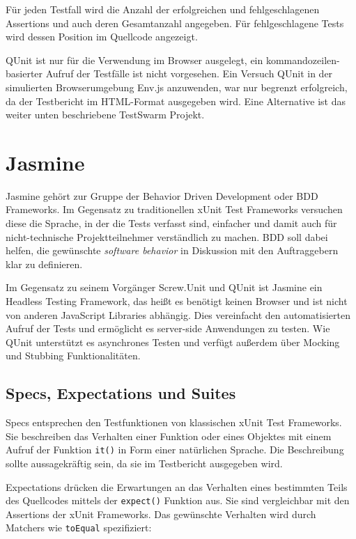 \documentclass[11pt, a4paper]{article}
\begin{document}
Für jeden Testfall wird die Anzahl der erfolgreichen und fehlgeschlagenen
Assertions und auch deren Gesamtanzahl angegeben. Für fehlgeschlagene
Tests wird dessen Position im Quellcode angezeigt.

QUnit ist nur für die Verwendung im Browser ausgelegt, ein
kommandozeilen-basierter Aufruf der Testfälle ist nicht vorgesehen. Ein
Versuch\cite{plee_qunit_2010} QUnit in der simulierten Browserumgebung
Env.js\cite{resig_envjs_2011} anzuwenden, war nur begrenzt erfolgreich, da der
Testbericht im HTML-Format ausgegeben wird. Eine Alternative ist das weiter
unten beschriebene TestSwarm Projekt.

\section{Jasmine}

Jasmine\cite{jasmine_jasmine_2011} gehört zur Gruppe der Behavior Driven
Development\cite{wikipedia_behavior_2011} oder BDD Frameworks. Im Gegensatz zu
traditionellen xUnit Test Frameworks versuchen diese die Sprache, in der die
Tests verfasst sind, einfacher und damit auch für nicht-technische
Projektteilnehmer verständlich zu machen. BDD soll dabei helfen, die gewünschte
\emph{software behavior} in Diskussion mit den Auftraggebern klar zu definieren.

Im Gegensatz zu seinem Vorgänger Screw.Unit\cite{sobo_screw.unit_2011} und QUnit
ist Jasmine ein Headless Testing Framework, das heißt es benötigt keinen
Browser und ist nicht von anderen JavaScript Libraries abhängig. Dies
vereinfacht den automatisierten Aufruf der Tests und ermöglicht es server-side
Anwendungen zu testen. Wie QUnit unterstützt es asynchrones Testen und verfügt
außerdem über Mocking und Stubbing Funktionalitäten.

\subsection{Specs, Expectations und Suites}

Specs entsprechen den Testfunktionen von klassischen xUnit Test Frameworks. Sie
beschreiben das Verhalten einer Funktion oder eines Objektes mit einem Aufruf
der Funktion \texttt{it()} in Form einer natürlichen Sprache. Die Beschreibung
sollte aussagekräftig sein, da sie im Testbericht ausgegeben wird.

Expectations drücken die Erwartungen an das Verhalten eines bestimmten Teils des
Quellcodes mittels der \texttt{expect()} Funktion aus. Sie sind vergleichbar mit
den Assertions der xUnit Frameworks. Das gewünschte Verhalten wird durch
Matchers wie \texttt{toEqual} spezifiziert:
\end{document}
